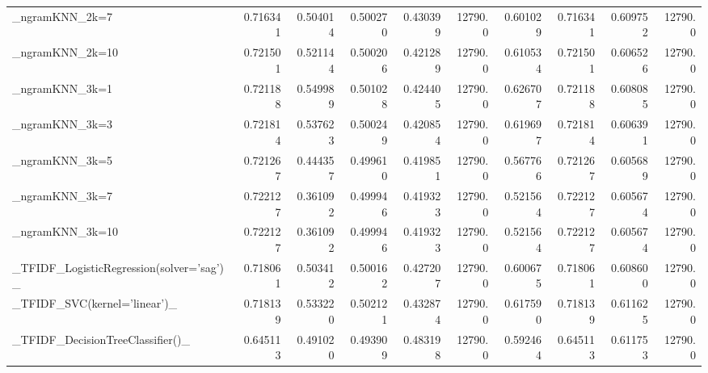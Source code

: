 \begin{tabular}{lrrrrrrrrr}
\_ngramKNN\_2k=7                                     &  0.716341 &         0.504014 &      0.500270 &        0.430399 &        12790.0 &            0.601029 &         0.716341 &           0.609752 &           12790.0 \\
\_ngramKNN\_2k=10                                    &  0.721501 &         0.521144 &      0.500206 &        0.421289 &        12790.0 &            0.610534 &         0.721501 &           0.606526 &           12790.0 \\
\_ngramKNN\_3k=1                                     &  0.721188 &         0.549989 &      0.501028 &        0.424405 &        12790.0 &            0.626707 &         0.721188 &           0.608085 &           12790.0 \\
\_ngramKNN\_3k=3                                     &  0.721814 &         0.537623 &      0.500249 &        0.420854 &        12790.0 &            0.619697 &         0.721814 &           0.606391 &           12790.0 \\
\_ngramKNN\_3k=5                                     &  0.721267 &         0.444357 &      0.499610 &        0.419851 &        12790.0 &            0.567766 &         0.721267 &           0.605689 &           12790.0 \\
\_ngramKNN\_3k=7                                     &  0.722127 &         0.361092 &      0.499946 &        0.419323 &        12790.0 &            0.521564 &         0.722127 &           0.605674 &           12790.0 \\
\_ngramKNN\_3k=10                                    &  0.722127 &         0.361092 &      0.499946 &        0.419323 &        12790.0 &            0.521564 &         0.722127 &           0.605674 &           12790.0 \\
\_TFIDF\_LogisticRegression(solver='sag')\_           &  0.718061 &         0.503412 &      0.500162 &        0.427207 &        12790.0 &            0.600675 &         0.718061 &           0.608600 &           12790.0 \\
\_TFIDF\_SVC(kernel='linear')\_                       &  0.718139 &         0.533220 &      0.502121 &        0.432874 &        12790.0 &            0.617590 &         0.718139 &           0.611625 &           12790.0 \\
\_TFIDF\_DecisionTreeClassifier()\_                   &  0.645113 &         0.491020 &      0.493909 &        0.483198 &        12790.0 &            0.592464 &         0.645113 &           0.611753 &           12790.0 \\

\end{tabular}
